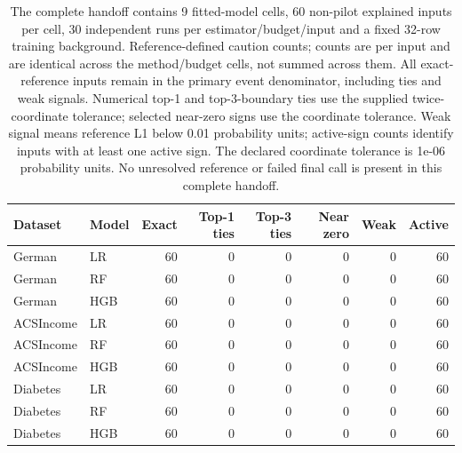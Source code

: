 \begin{table}[tb]
\centering
\caption{The complete handoff contains 9 fitted-model cells, 60 non-pilot explained inputs per cell, 30 independent runs per estimator/budget/input and a fixed 32-row training background. Reference-defined caution counts; counts are per input and are identical across the method/budget cells, not summed across them. All exact-reference inputs remain in the primary event denominator, including ties and weak signals. Numerical top-1 and top-3-boundary ties use the supplied twice-coordinate tolerance; selected near-zero signs use the coordinate tolerance. Weak signal means reference L1 below 0.01 probability units; active-sign counts identify inputs with at least one active sign. The declared coordinate tolerance is 1e-06 probability units. No unresolved reference or failed final call is present in this complete handoff.}
\label{tab:reference-assessability}
\small
\begin{tabular}{llrrrrrr}
\toprule
Dataset & Model & Exact & Top-1 ties & Top-3 ties & Near zero & Weak & Active \\
\midrule
German & LR & 60 & 0 & 0 & 0 & 0 & 60 \\
German & RF & 60 & 0 & 0 & 0 & 0 & 60 \\
German & HGB & 60 & 0 & 0 & 0 & 0 & 60 \\
ACSIncome & LR & 60 & 0 & 0 & 0 & 0 & 60 \\
ACSIncome & RF & 60 & 0 & 0 & 0 & 0 & 60 \\
ACSIncome & HGB & 60 & 0 & 0 & 0 & 0 & 60 \\
Diabetes & LR & 60 & 0 & 0 & 0 & 0 & 60 \\
Diabetes & RF & 60 & 0 & 0 & 0 & 0 & 60 \\
Diabetes & HGB & 60 & 0 & 0 & 0 & 0 & 60 \\
\bottomrule
\end{tabular}
\end{table}
